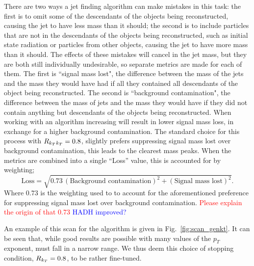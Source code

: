 There are two ways a jet finding algorithm can make mistakes in this task:
the first is to omit some of the descendants of the objects being reconstructed, causing the jet to have less mass than it should;
the second is to include particles that are not in the descendants of the objects being reconstructed, such as initial state radiation or particles from other objects,
causing the jet to have more mass than it should.
The effects of these mistakes will cancel in the jet mass,
but they are both still individually undesirable,
so separate metrics are made for each of them.
The first is ``signal mass lost", the difference between the mass of the jets and the mass they would have had if all they contained all descendants of the object being reconstructed.
The second is ``background contamination", the difference between the mass of jets and the mass they would have if they did not contain anything but descendants of the objects being reconstructed.
When working with an \antikt{} algorithm increasing \ktstoppingdeltar{} will result in lower signal mass loss, in exchange for a higher background contamination.
The standard choice for this process with \(R_{k_T}{}_{k_T}=0.8\), slightly prefers suppressing signal mass lost over background contamination,
this leads to the clearest mass peaks.
When the metrics are combined into a single ``Loss'' value, this is accounted for by weighting;
\begin{equation}\label{eqn:loss}
\text{Loss} = \sqrt{0.73\,(\text{Background contamination})^2 + (\text{Signal mass lost})^2}.
\end{equation}
Where \(0.73\) is the weighting used to to account for the aforementioned preference for suppressing signal mass lost over background contamination.
{\textcolor{red}{Please explain the origin of that 0.73}} {\textcolor{blue}{HADH improved?}}

An example of this scan for the \genkt{} algorithm is given in Fig.~\ref{fig:scan_genkt}. 
It can be seen that, while good results are possible with many values of the \(p_T\) exponent,
                \ktstoppingdeltar{} must fall in a narrow range. We thus deem this choice of  stopping condition, \(R{}_{k_T}=0.8\), to be rather fine-tuned.

